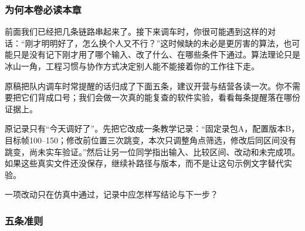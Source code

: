 \subsubsection{为何本卷必读本章}

前面我们已经把几条链路串起来了。接下来调车时，你很可能遇到这样的对话：“刚才明明好了，怎么换个人又不行？”这时候缺的未必是更厉害的算法，也可能只是没有记下刚才用了哪个输入、改了什么、在哪些条件下通过。算法理论只是冰山一角，工程习惯与协作方式决定别人能不能接着你的工作往下走。

原稿把队内调车时常提醒的话归成了下面五条，建议开营与结营各读一次。你不需要把它们背成口号；我们会做一次真的能复查的软件实验，看看每条提醒落在哪份证据上。

\begin{example}[把“好了”改写成证据]
原记录只有“今天调好了”。先把它改成一条教学记录：“固定录包A，配置版本B，目标帧100--150；修改前位置三次跳变，本次只调整角点筛选，修改后同区间没有跳变，尚未实车验证。”然后让另一位同学指出输入、比较区间、改动和未完成项。如果这些真实文件还没保存，继续补路径与版本，而不是让这句示例文字替代实验。
\end{example}

\begin{exercise}
\label{v3-ex-engineering-1}
一项改动只在仿真中通过，记录中应怎样写结论与下一步？
\end{exercise}

\subsubsection{五条准则}

